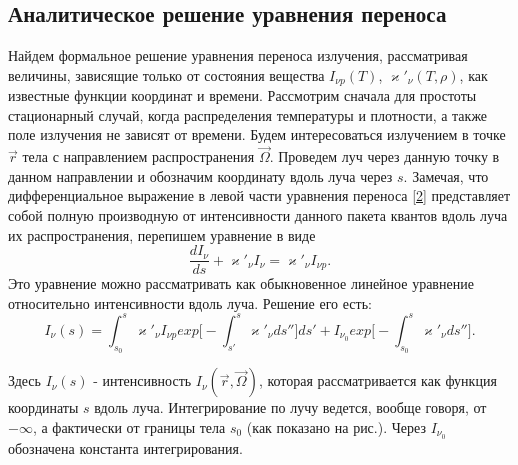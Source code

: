 \subsection{Аналитическое решение уравнения переноса}
Найдем формальное решение уравнения переноса излучения, рассматривая величины, зависящие только от состояния вещества $I_{\nu p}(T)$, $\varkappa'_{\nu}(T, \rho)$, как известные функции координат и времени. Рассмотрим сначала для простоты стационарный случай, когда распределения температуры и плотности, а также поле излучения не зависят от времени. Будем интересоваться излучением в точке $\vec r$ тела с направлением распространения $\vec \Omega$. Проведем луч через данную точку в данном направлении и обозначим координату вдоль луча через $s$. Замечая, что дифференциальное выражение в левой части уравнения переноса \eqref{2} представляет собой полную производную от интенсивности данного пакета квантов вдоль луча их распространения, перепишем уравнение в виде
\begin {equation}
\frac{dI_{\nu}}{ds} + \varkappa'_{\nu}I_{\nu} = \varkappa'_{\nu}I_{\nu p}.
\end {equation}
Это уравнение можно рассматривать как обыкновенное линейное уравнение относительно интенсивности вдоль луча. Решение его есть:
\begin {equation}
I_{\nu}(s) = \int_{s_0}^s\varkappa'_{\nu}I_{\nu p} exp\Big[-\int_{s'}^s\varkappa'_{\nu}ds''\Big]ds' + I_{\nu_0} exp\Big[-\int_{s_0}^s \varkappa'_{\nu}ds''\Big].
\end {equation}

Здесь $I_{\nu}(s)$ - интенсивность $I_{\nu}(\vec r, \vec\Omega)$, которая рассматривается как функция координаты $s$ вдоль луча. Интегрирование по лучу ведется, вообще говоря, от $-\infty$, а фактически от границы тела $s_0$ (как показано на рис.). Через $I_{\nu_ 0}$ обозначена константа интегрирования. 

